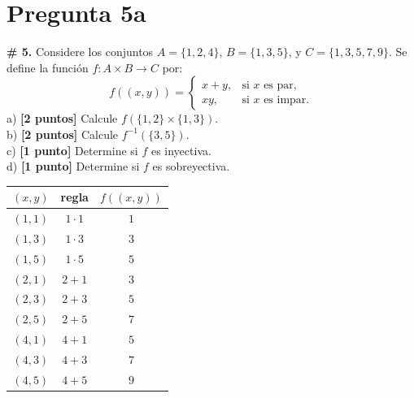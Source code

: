 \documentclass[11pt]{article}
\newcommand{\hl}[1]{\colorbox{green!35}{#1}}
\begin{document}
\clearpage
\section*{Pregunta 5a}

\textbf{\# 5.} Considere los conjuntos $A=\{1,2,4\}$, $B=\{1,3,5\}$, y $C=\{1,3,5,7,9\}$. Se define la función $f:A\times B\to C$ por:
\[f((x,y))=\begin{cases}x+y, & \text{si } x \text{ es par},\\ xy, & \text{si } x \text{ es impar}.\end{cases}\]
a) \textbf{[2 puntos]} Calcule \hl{$f(\{1,2\}\times\{1,3\})$}.\\
b) \textbf{[2 puntos]} Calcule $f^{-1}(\{3,5\})$.\\
c) \textbf{[1 punto]} Determine si $f$ es inyectiva.\\
d) \textbf{[1 punto]} Determine si $f$ es sobreyectiva.

\begin{minipage}[c]{0.45\textwidth}
\centering
\renewcommand{\arraystretch}{1.2}
\begin{tabular}{|c|c|c|}\hline
$(x,y)$ & regla & $f((x,y))$\\\hline
$(1,1)$ & $1\cdot1$ & $1$\\
$(1,3)$ & $1\cdot3$ & $3$\\
$(1,5)$ & $1\cdot5$ & $5$\\
$(2,1)$ & $2+1$ & $3$\\
$(2,3)$ & $2+3$ & $5$\\
$(2,5)$ & $2+5$ & $7$\\
$(4,1)$ & $4+1$ & $5$\\
$(4,3)$ & $4+3$ & $7$\\
$(4,5)$ & $4+5$ & $9$\\\hline
\end{tabular}
\end{minipage}\hfill
\begin{minipage}[c]{0.5\textwidth}
\centering
{}
\end{minipage}

\end{document}
